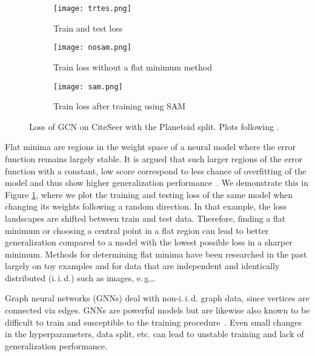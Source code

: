 \documentclass[runningheads]{llncs}
\newcommand{\eg}{e.\,g.,\xspace}
\newcommand{\iid}{i.\,i.\,d.}
\begin{document}
\begin{figure*}
     \centering
     \begin{subfigure}[b]{0.3\textwidth}
         \centering
         \texttt{[image: trtes.png]}
         \caption{Train and test loss}
         \label{fig:trte}
     \end{subfigure}\begin{subfigure}[b]{0.3\textwidth}
         \centering
         \texttt{[image: nosam.png]}
         \caption{Train loss without a flat minimum method}
         \label{fig:base}
     \end{subfigure}\begin{subfigure}[b]{0.3\textwidth} 
         \centering
         \texttt{[image: sam.png]}
         \caption{Train loss after training using SAM}
         \label{fig:sam}
     \end{subfigure}
        \caption{Loss of GCN on CiteSeer with the Planetoid split. Plots following \cite{DBLP:conf/nips/Li0TSG18}.}
        \label{fig:three graphs}
\end{figure*}



Flat minima are regions in the weight space of a neural model where the error function remains largely stable.
It is argued that such larger regions of the error function with a constant, low score correspond to less chance of overfitting of the model and thus show higher generalization performance~\cite{HochreiterS94,flatminima}.
We demonstrate this in Figure \ref{fig:trte}, where we plot the training and testing loss of the same model when changing its weights following a random direction.
In that example, the loss landscapes are shifted between train and test data.
Therefore, finding a flat minimum or choosing a central point in a flat region can lead to better generalization compared to a model with the lowest possible loss in a sharper minimum.
Methods for determining flat minima have been researched in the past largely on toy examples and for data that are independent and identically distributed (\iid) such as images, \eg \cite{swa,Foret21sharpness,zhao2022penalizing,GSAM,orvieto2022anticorrelated,SAF}.

Graph neural networks (GNNs) deal with non-i.\,i.\,d. graph data, since vertices are connected via edges.
GNNs are powerful models but are likewise also known to be difficult to train and susceptible to the training procedure~\cite{Shchur18pitfalls}.
Even small changes in the hyperparameters, data split, etc. can lead to unstable training and lack of generalization performance.
\end{document}
